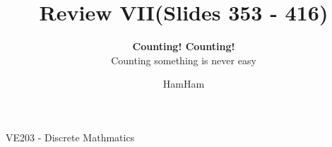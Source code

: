 \documentclass{beamer}
\title{\sffamily Review VII(Slides 353 - 416)}
\subtitle{\textbf{Counting! Counting!}\\Counting something is never easy}
\institute[UM-SJTU JI]{University of Michigan-Shanghai Jiao Tong University Joint Institute}
\author{HamHam}
\newcommand{\myfont}{\rmfamily\normalsize\upshape\mdseries}
\begin{document}
\begin{titlepage}
    \begin{center}
        VE203 - Discrete Mathmatics 
    \end{center}
\end{titlepage}
\myfont
\newcommand{\binomial}[2]{\begin{pmatrix} {#1}\\{#2}	\end{pmatrix}}
\newcommand{\green}[1]{\textcolor[rgb]{0.3,0.6,0}{#1}}
\end{document}
